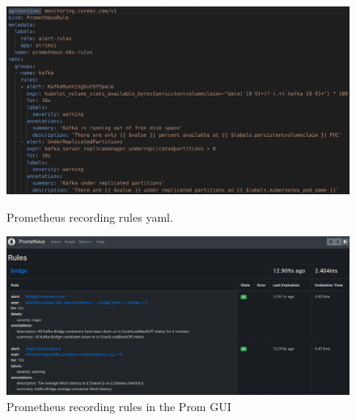 \begin{figure}[H]
	\centering
	\includegraphics[width=1\linewidth]{figures/prom_rules_yaml.png}
	\caption{Prometheus recording rules yaml.}
	\label{fig:prom_recording_rules}
	\includegraphics[width=1\linewidth]{figures/prom_rules_gui.png}
	\caption{Prometheus recording rules in the Prom GUI}
	\label{fig:prom_rules_gui}
\end{figure}

